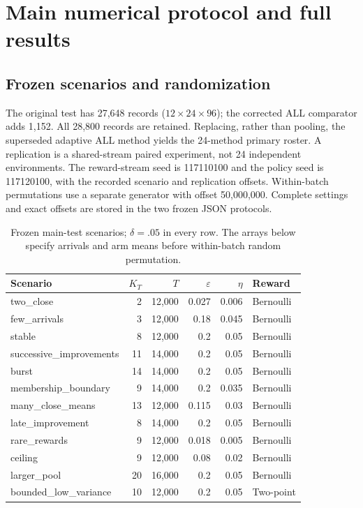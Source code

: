 \documentclass[11pt]{article}
\theoremstyle{remark}
\begin{document}
\FloatBarrier
\section{Main numerical protocol and full results}\label{sec:main-numerical-protocol}
\subsection{Frozen scenarios and randomization}
The original test has 27,648 records ($12\times24\times96$); the corrected ALL comparator adds 1,152. All 28,800 records are retained. Replacing, rather than pooling, the superseded adaptive ALL method yields the 24-method primary roster. A replication is a shared-stream paired experiment, not 24 independent environments. The reward-stream seed is 117110100 and the policy seed is 117120100, with the recorded scenario and replication offsets. Within-batch permutations use a separate generator with offset 50,000,000. Complete settings and exact offsets are stored in the two frozen JSON protocols.
\begin{table}[t]
\centering
\caption{Frozen main-test scenarios; $\delta=.05$ in every row. The arrays below specify arrivals and arm means before within-batch random permutation.}
\label{tab:main-scenarios}
\footnotesize
\begin{tabular}{lrrrrl}
\toprule
Scenario & $K_T$ & $T$ & $\varepsilon$ & $\eta$ & Reward \\
\midrule
two\_close & 2 & 12,000 & 0.027 & 0.006 & Bernoulli \\
few\_arrivals & 3 & 12,000 & 0.18 & 0.045 & Bernoulli \\
stable & 8 & 12,000 & 0.2 & 0.05 & Bernoulli \\
successive\_improvements & 11 & 14,000 & 0.2 & 0.05 & Bernoulli \\
burst & 14 & 14,000 & 0.2 & 0.05 & Bernoulli \\
membership\_boundary & 9 & 14,000 & 0.2 & 0.035 & Bernoulli \\
many\_close\_means & 13 & 12,000 & 0.115 & 0.03 & Bernoulli \\
late\_improvement & 8 & 14,000 & 0.2 & 0.05 & Bernoulli \\
rare\_rewards & 9 & 12,000 & 0.018 & 0.005 & Bernoulli \\
ceiling & 9 & 12,000 & 0.08 & 0.02 & Bernoulli \\
larger\_pool & 20 & 16,000 & 0.2 & 0.05 & Bernoulli \\
bounded\_low\_variance & 10 & 12,000 & 0.2 & 0.05 & Two-point \\
\bottomrule
\end{tabular}
\end{table}
\end{document}

